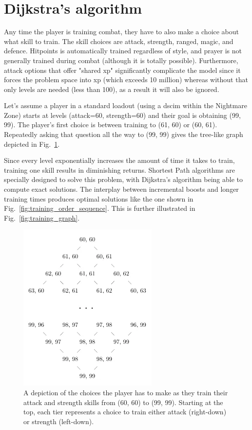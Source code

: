 \section{Dijkstra's algorithm}
	Any time the player is training combat, they have to also make a choice about what skill to train. The skill choices are attack, strength, ranged, magic, and defence. Hitpoints is automatically trained regardless of style, and prayer is not generally trained during combat (although it is totally possible). Furthermore, attack options that offer "shared xp" significantly complicate the model since it forces the problem space into xp (which exceeds 10 million) whereas without that only levels are needed (less than 100), as a result it will also be ignored.

	Let's assume a player in a standard loadout (using a dscim within the Nightmare Zone) starts at levels (attack=60, strength=60) and their goal is obtaining (99, 99). The player's first choice is between training to (61, 60) or (60, 61). Repeatedly asking that question all the way to (99, 99) gives the tree-like graph depicted in Fig.~\ref{fig:training_order60}. 


	Since every level exponentially increases the amount of time it takes to train, training one skill results in diminishing returns. Shortest Path algorithms are specially designed to solve this problem, with Dijkstra's algorithm being able to compute exact solutions. The interplay between incremental boosts and longer training times produces optimal solutions like the one shown in Fig.~\ref{fig:training_order_sequence}. This is further illustrated in Fig.~\ref{fig:training_graph}.

	\begin{figure}
		\centering
		\includegraphics[width=0.5\linewidth]{img/combat/training_order60.png}
		\caption{
			A depiction of the choices the player has to make as they train their attack and strength skills from (60, 60) to (99, 99). Starting at the top, each tier represents a choice to train either attack (right-down) or strength (left-down).
		}
		\label{fig:training_order60}
	\end{figure}


